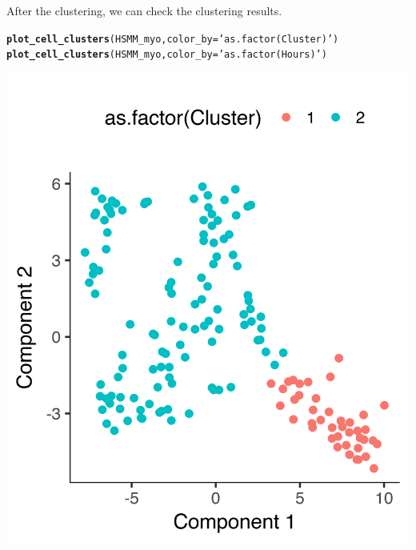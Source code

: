 \documentclass[10pt,oneside]{article}\usepackage[]{graphicx}\usepackage[]{color}
\makeatletter
\def\maxwidth{ %
  \ifdim\Gin@nat@width>\linewidth
    \linewidth
  \else
    \Gin@nat@width
  \fi
}
\newcommand{\hlstr}[1]{\textcolor[rgb]{0.192,0.494,0.8}{#1}}%
\newcommand{\hlstd}[1]{\textcolor[rgb]{0.345,0.345,0.345}{#1}}%
\newcommand{\hlkwc}[1]{\textcolor[rgb]{0.333,0.667,0.333}{#1}}%
\newcommand{\hlkwd}[1]{\textcolor[rgb]{0.737,0.353,0.396}{\textbf{#1}}}%
\newenvironment{kframe}{%
 \def\at@end@of@kframe{}%
 \ifinner\ifhmode%
  \def\at@end@of@kframe{\end{minipage}}%
  \begin{minipage}{\columnwidth}%
 \fi\fi%
 \def\FrameCommand##1{\hskip\@totalleftmargin \hskip-\fboxsep
 \colorbox{shadecolor}{##1}\hskip-\fboxsep
     \hskip-\linewidth \hskip-\@totalleftmargin \hskip\columnwidth}%
 \MakeFramed {\advance\hsize-\width
   \@totalleftmargin\z@ \linewidth\hsize
   \@setminipage}}%
 {\par\unskip\endMakeFramed%
 \at@end@of@kframe}
\newenvironment{knitrout}{}{} %
\makeatother
\begin{document}
After the clustering, we can check the clustering results. 
\begin{knitrout}
\color{fgcolor}\begin{kframe}
\begin{alltt}
\hlkwd{plot_cell_clusters}\hlstd{(HSMM_myo,} \hlkwc{color_by} \hlstd{=} \hlstr{'as.factor(Cluster)'}\hlstd{)}
\hlkwd{plot_cell_clusters}\hlstd{(HSMM_myo,} \hlkwc{color_by} \hlstd{=} \hlstr{'as.factor(Hours)'}\hlstd{)}
\end{alltt}
\end{kframe}
\includegraphics[width=\maxwidth]{figure/check_the_clustering_results-1} 

\end{knitrout}
\end{document}
